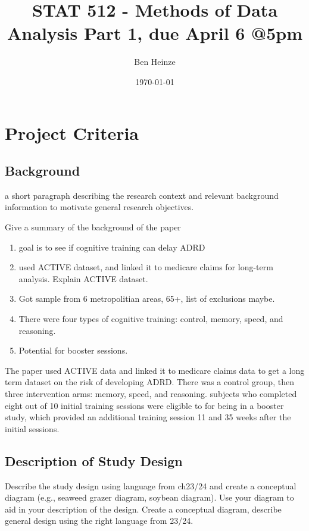 \documentclass[11pt]{article}
\author{Ben Heinze}
\date{\today}
\title{STAT 512 - Methods of Data Analysis Part 1, due April 6 @5pm}
\begin{document}
\maketitle
\tableofcontents

\section{Project Criteria}
\label{sec:orge7f19f2}

\subsection{Background}
\label{sec:org3a3160d}

a short paragraph describing the research context and relevant background information to motivate general research objectives.

Give a summary of the background of the paper

\begin{enumerate}
\item goal is to see if cognitive training can delay ADRD
\item used ACTIVE dataset, and linked it to medicare claims for long-term analysis. Explain ACTIVE dataset.
\item Got sample from 6 metropolitian areas, 65+, list of exclusions maybe.
\item There were four types of cognitive training: control, memory, speed, and reasoning.
\item Potential for booster sessions.
\end{enumerate}

The paper used ACTIVE data and linked it to medicare claims data to get a long term dataset on the risk of developing ADRD. There was a control group, then three intervention arms: memory, speed, and reasoning. subjects who completed eight out of 10 initial training sessions were eligible to for being in a booster study, which provided an additional training session 11 and 35 weeks after the initial sessions. 

\subsection{Description of Study Design}
\label{sec:org1611d47}

Describe the study design using language from ch23/24 and create a conceptual diagram (e.g., seaweed grazer diagram, soybean diagram). Use your diagram to aid in your description of the design.
Create a conceptual diagram, describe general design using the right language from 23/24.
\end{document}

